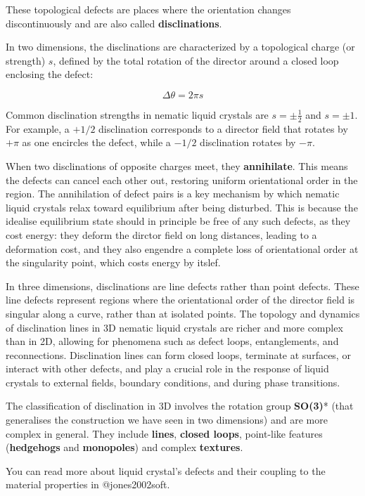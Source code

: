 \documentclass[
  letterpaper,
  enabledeprecatedfontcommands]{report}
\begin{document}
These topological defects are places where the orientation changes
discontinuously and are also called \textbf{disclinations}.

In two dimensions, the disclinations are characterized by a topological
charge (or strength) \(s\), defined by the total rotation of the
director around a closed loop enclosing the defect:

\[
\Delta \theta = 2\pi s
\]

Common disclination strengths in nematic liquid crystals are
\(s = \pm \frac{1}{2}\) and \(s = \pm 1\). For example, a \(+1/2\)
disclination corresponds to a director field that rotates by \(+\pi\) as
one encircles the defect, while a \(-1/2\) disclination rotates by
\(-\pi\).

When two disclinations of opposite charges meet, they
\textbf{annihilate}. This means the defects can cancel each other out,
restoring uniform orientational order in the region. The annihilation of
defect pairs is a key mechanism by which nematic liquid crystals relax
toward equilibrium after being disturbed. This is because the idealise
equilibrium state should in principle be free of any such defects, as
they cost energy: they deform the dirctor field on long distances,
leading to a deformation cost, and they also engendre a complete loss of
orientational order at the singularity point, which costs energy by
itslef.

In three dimensions, disclinations are line defects rather than point
defects. These line defects represent regions where the orientational
order of the director field is singular along a curve, rather than at
isolated points. The topology and dynamics of disclination lines in 3D
nematic liquid crystals are richer and more complex than in 2D, allowing
for phenomena such as defect loops, entanglements, and reconnections.
Disclination lines can form closed loops, terminate at surfaces, or
interact with other defects, and play a crucial role in the response of
liquid crystals to external fields, boundary conditions, and during
phase transitions.

The classification of disclination in 3D involves the rotation group
\textbf{SO(3)}* (that generalises the construction we have seen in two
dimensions) and are more complex in general. They include
\textbf{lines}, \textbf{closed loops}, point-like features
(\textbf{hedgehogs} and \textbf{monopoles}) and complex
\textbf{textures}.

You can read more about liquid crystal's defects and their coupling to
the material properties in @jones2002soft.
\end{document}
